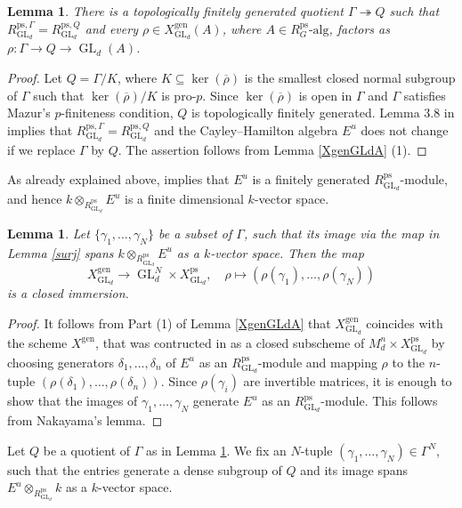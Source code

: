 \documentclass{amsart}
\newtheorem{lem}[prop]{Lemma}
\theoremstyle{definition}
\theoremstyle{remark}
\DeclareMathOperator{\GL}{GL}
\newcommand{\alg}{\mathrm{alg}}
\newcommand{\rhobar}{\overline{\rho}}
\newcommand{\ps}{\mathrm{ps}}
\newcommand{\gen}{\mathrm{gen}}
\newcommand{\RpsGLd}{R^{\ps}_{\GL_d}}
\newcommand{\XgenGLd}{X^{\gen}_{\GL_d}}
\newcommand{\XpsGLd}{X^{\ps}_{\GL_d}}
\begin{document}
\begin{lem}\label{fg_quotient} There is a topologically finitely generated quotient $\Gamma\twoheadrightarrow Q$ 
such that $R^{\ps, \Gamma}_{\GL_d}=R^{\ps,Q}_{\GL_d}$ and every $\rho\in X^{\gen}_{\GL_d}(A)$, 
where $A\in R^{\ps}_G\text{-}\alg$, factors as $\rho: \Gamma \rightarrow Q \rightarrow \GL_d(A)$.
\end{lem}
\begin{proof} Let $Q= \Gamma/K$, where $K\subseteq \ker(\rhobar)$ is the smallest closed 
normal subgroup of $\Gamma$ such that $\ker(\rhobar)/K$ is pro-$p$. Since $\ker(\rhobar)$ 
is open in $\Gamma$ and $\Gamma$ satisfies Mazur's $p$-finiteness condition, $Q$ is topologically 
finitely generated. Lemma 3.8 in \cite{che_durham} implies that $R^{\ps, \Gamma}_{\GL_d}=R^{\ps,Q}_{\GL_d}$
and the Cayley--Hamilton algebra $E^u$ does not change if we replace $\Gamma$ by $Q$. The assertion 
follows from Lemma \ref{XgenGLdA} (1). 
\end{proof}

As already explained above, \cite[Proposition 3.6]{WE_alg} implies that $E^{u}$ is a finitely generated $\RpsGLd$-module, and hence $k\otimes_{\RpsGLd}E^u$ is a 
finite dimensional $k$-vector space. 


\begin{lem}\label{closedimmersionforGLd} Let $\{\gamma_1, \ldots, \gamma_N\}$ be a subset  of $\Gamma$, such that its image via the map in Lemma \ref{surj} spans $k\otimes_{\RpsGLd}E^u$ as a $k$-vector space. 
Then the  map 
$$ \XgenGLd \rightarrow \GL_d^N\times \XpsGLd, \quad \rho\mapsto (\rho(\gamma_1), \ldots, \rho(\gamma_N))$$
is a closed immersion.
\end{lem}
\begin{proof} It follows from Part (1) of Lemma \ref{XgenGLdA} that $\XgenGLd$ coincides with the scheme $X^{\gen}$, that
was contructed in \cite[Lemma 3.1]{BIP_new} as a closed subscheme of $M_d^{n}\times \XpsGLd$ by choosing generators $\delta_1, \ldots, \delta_n$ of $E^u$ as an $\RpsGLd$-module and mapping $\rho$ 
to the $n$-tuple $(\rho(\delta_1), \ldots, \rho(\delta_n))$. 
Since $\rho(\gamma_i)$ are invertible matrices, it is enough to show that 
the images of $\gamma_1, \ldots, \gamma_N$ generate $E^u$ as
an $\RpsGLd$-module. This follows from Nakayama's lemma. 
\end{proof}



Let $Q$ be a quotient of $\Gamma$ as in Lemma \ref{fg_quotient}. We fix an $N$-tuple $(\gamma_1, \ldots, \gamma_N)\in \Gamma^N$, such that the entries 
generate a dense subgroup of $Q$ and its image spans $E^u\otimes_{\RpsGLd} k$ as a $k$-vector space.
\end{document}
